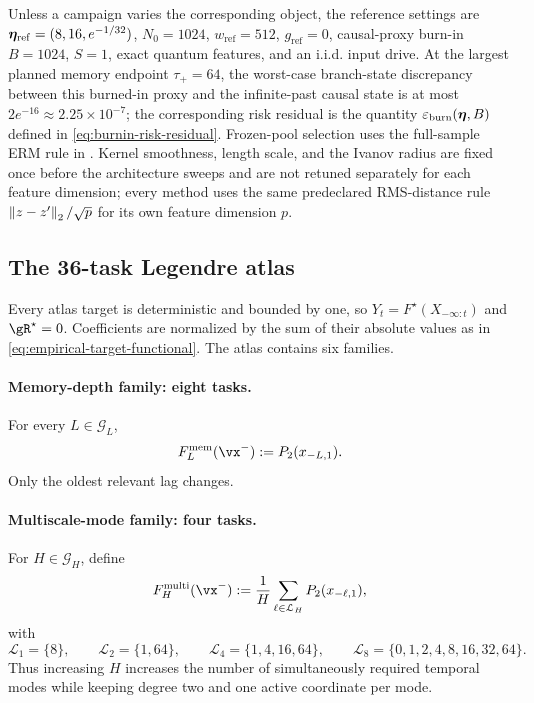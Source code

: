 Unless a campaign varies the corresponding object, the reference settings are
$\bm{\eta}_{\mathrm{ref}}=(8,16,e^{-1/32})$, $N_0=1024$,
$w_{\mathrm{ref}}=512$, $g_{\mathrm{ref}}=0$, causal-proxy burn-in $B=1024$,
$S=1$, exact quantum features, and an i.i.d. input drive.  At the largest planned memory
endpoint $\tau_+=64$, the worst-case branch-state discrepancy between this
burned-in proxy and the infinite-past causal state is at most
$2e^{-16}\approx2.25\times10^{-7}$; the corresponding risk residual is the
quantity $\varepsilon_{\mathrm{burn}}(\bm{\eta},B)$ defined in
\cref{eq:burnin-risk-residual}.  Frozen-pool selection uses the
full-sample ERM rule in .  Kernel smoothness, length
scale, and the Ivanov radius
are fixed once before the architecture sweeps and are not retuned separately
for each feature dimension; every method uses the same predeclared RMS-distance
rule $\left\lVert z-z'\right\rVert_2/\sqrt p$ for its own feature dimension $p$.

\subsection{The 36-task Legendre atlas}
\label{app:task-atlas}

Every atlas target is deterministic and bounded by one, so
$Y_t=F^\star(X_{-\infty:t})$ and $\risk^\star=0$.  Coefficients are normalized
by the sum of their absolute values as in
\cref{eq:empirical-target-functional}.  The atlas contains six families.

\paragraph{Memory-depth family: eight tasks.}
For every $L\in\mathcal G_L$,
\begin{equation}
    F^{\mathrm{mem}}_L(\vx^-):=P_2(x_{-L,1}).
    \label{eq:atlas-memory}
\end{equation}
Only the oldest relevant lag changes.

\paragraph{Multiscale-mode family: four tasks.}
For $H\in\mathcal G_H$, define
\begin{equation}
    F^{\mathrm{multi}}_H(\vx^-)
       :=\frac1H\sum_{\ell\in\mathcal L_H}P_2(x_{-\ell,1}),
    \label{eq:atlas-multiscale}
\end{equation}
with
\[
\mathcal L_1=\{8\},\qquad
\mathcal L_2=\{1,64\},\qquad
\mathcal L_4=\{1,4,16,64\},\qquad
\mathcal L_8=\{0,1,2,4,8,16,32,64\}.
\]
Thus increasing $H$ increases the number of simultaneously required temporal
modes while keeping degree two and one active coordinate per mode.

